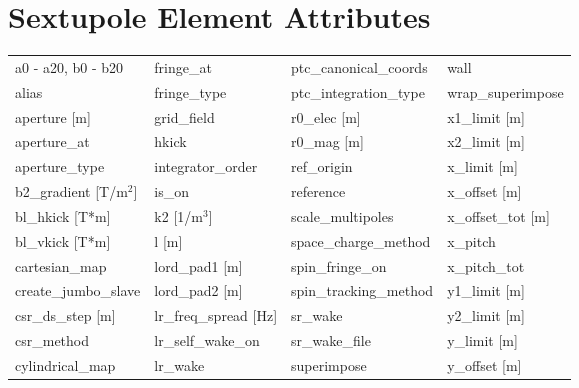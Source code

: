  \section{Sextupole Element Attributes}
 \label{s:list.sextupole}
 
 \begin{tabular}{llll} \toprule
a0 - a20, b0 - b20               & fringe_at                        & ptc_canonical_coords             & wall                             \\
alias                            & fringe_type                      & ptc_integration_type             & wrap_superimpose                 \\
aperture [m]                     & grid_field                       & r0_elec [m]                      & x1_limit [m]                     \\
aperture_at                      & hkick                            & r0_mag [m]                       & x2_limit [m]                     \\
aperture_type                    & integrator_order                 & ref_origin                       & x_limit [m]                      \\
b2_gradient [T/m$^2$]            & is_on                            & reference                        & x_offset [m]                     \\
bl_hkick [T*m]                   & k2 [1/m$^3$]                     & scale_multipoles                 & x_offset_tot [m]                 \\
bl_vkick [T*m]                   & l [m]                            & space_charge_method              & x_pitch                          \\
cartesian_map                    & lord_pad1 [m]                    & spin_fringe_on                   & x_pitch_tot                      \\
create_jumbo_slave               & lord_pad2 [m]                    & spin_tracking_method             & y1_limit [m]                     \\
csr_ds_step [m]                  & lr_freq_spread [Hz]              & sr_wake                          & y2_limit [m]                     \\
csr_method                       & lr_self_wake_on                  & sr_wake_file                     & y_limit [m]                      \\
cylindrical_map                  & lr_wake                          & superimpose                      & y_offset [m]                     \\

\end{tabular}
